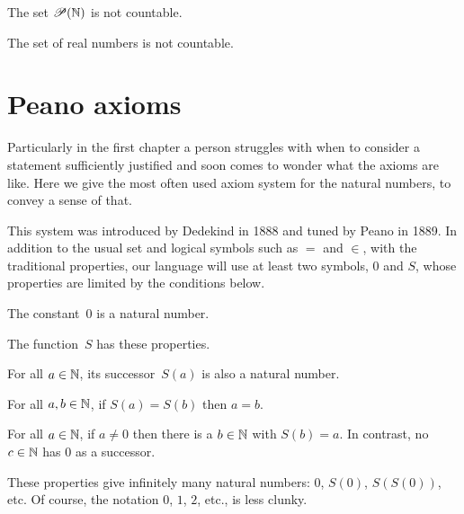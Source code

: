 \documentclass{ibl}
\begin{document}
\begin{ex}
\begin{exes}
\item The set $\mathscr{P}(\mathbb{N})$ is not countable.
\item The set of real numbers is not countable.  
\end{exes}
\end{ex}




\appendix
\chapter{Peano axioms}
\newcommand{\axiom}[1]{\textsc{Axiom~#1}\hspace{.5ex}}

Particularly in the 
first chapter a person struggles with when to consider a 
statement sufficiently justified 
and soon comes to wonder what the axioms are like.
Here we give the most often used axiom system for the natural numbers, to
convey a sense of that. 

This system was 
introduced by Dedekind in 1888 and tuned by Peano in 1889.
In addition to the usual set and logical symbols such as $=$ and $\in$,
with the traditional properties, 
our language will use at least two symbols, $0$ and $S$, whose 
properties are limited by the conditions below.

\begin{ax}
The constant~$0$ is a natural number.
\end{ax}

\begin{ax}
The  function~$S$ has these properties.
\begin{exes}
\item {} For all $a\in\mathbb{N}$, its successor~$S(a)$ is also 
  a natural number.
\item {} For all $a,b\in\mathbb{N}$, if $S(a)=S(b)$ then $a=b$.
\item {}
  For all $a\in\mathbb{N}$, if $a\neq 0$ then there is a $b\in\mathbb{N}$ with $S(b)=a$.
  In contrast, no $c\in\mathbb{N}$ has $0$ as a successor.  
\end{exes}
\end{ax}


These properties give infinitely many natural numbers:
$0$, $S(0)$, $S(S(0))$, etc.
Of course, the notation $0$, $1$, $2$, etc., is less clunky.
\end{document}

